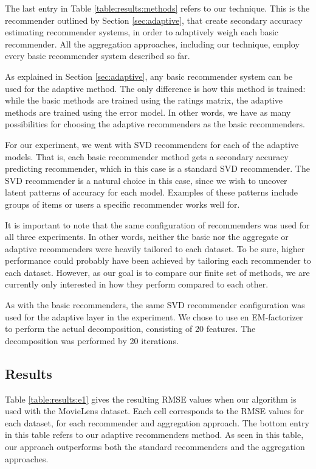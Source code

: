 The last entry in Table \ref{table:results:methods}
refers to our technique. 
This is the recommender outlined by Section \ref{sec:adaptive},
that create secondary accuracy estimating recommender systems,
in order to adaptively weigh each basic recommender.
All the aggregation approaches, including our technique,
employ every basic recommender system described so far.

As explained in Section \ref{sec:adaptive},
any basic recommender system can be used for the adaptive method.
The only difference is how this method is trained:
while the basic methods are trained using the ratings matrix,
the adaptive methods are trained using the error model.
In other words, we have as many possibilities for choosing
the adaptive recommenders as the basic recommenders.

For our experiment, we went with SVD recommenders
for each of the adaptive models.
That is, each basic recommender method gets a secondary 
accuracy predicting recommender, which in this case is a 
standard SVD recommender.
The SVD recommender is a natural choice in this case,
since we wish to uncover latent patterns of accuracy
for each model.
Examples of these patterns include groups of items
or users a specific recommender works well for.

It is important to note that the same configuration of recommenders was used for all three experiments.
In other words, neither the basic nor the aggregate or adaptive recommenders were heavily tailored
to each dataset. To be sure, higher performance could probably have been achieved
by tailoring each recommender to each dataset. However,
as our goal is to compare our finite set of methods, 
we are currently only interested in 
how they perform compared to each other.

As with the basic recommenders, the same SVD recommender configuration was used 
for the adaptive layer in the experiment.
We chose to use en EM-factorizer to perform the actual decomposition,
consisting of 20 features. The decomposition was performed by 20 iterations.


\subsection{Results}

Table \ref{table:results:e1} gives the resulting RMSE values when our algorithm is used with the MovieLens dataset.
Each cell corresponds to the RMSE values for each dataset,
for each recommender and aggregation approach.
The bottom entry in this table refers to our adaptive recommenders method.
As seen in this table, our approach outperforms both the standard recommenders
and the aggregation approaches.

